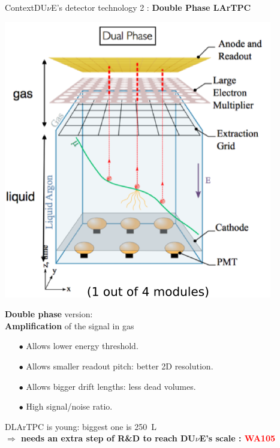 \documentclass[10pt]{beamer}
\begin{document}
    \begin{frame}{Context}{DU$\nu$E's detector technology 2 : \textbf{Double Phase LArTPC}}
    	\begin{scriptsize}
    		\begin{minipage}{0.48\textwidth}
    			\includegraphics[width=\textwidth]{figures/contexte/dlartpc.png}\\
    		\end{minipage}
    		\hfill
    		\begin{minipage}{0.48\textwidth}
    			\textbf{Double phase} version: \\\textbf{Amplification} of the signal in gas
    			\begin{itemize}
    				\item[$\bullet$] Allows lower energy threshold.
    				\item[$\bullet$] Allows smaller readout pitch: better 2D resolution.
    				\item[$\bullet$] Allows bigger drift lengths: less dead volumes.
    				\item[$\bullet$] High signal/noise ratio.
    			\end{itemize}    			
    		\end{minipage}
    	\end{scriptsize}
    	\centering
    	DLArTPC is young: biggest one is \SI{250}{\liter}\\
    	\textbf{$\Rightarrow$ needs an extra step of R\&D to reach DU$\nu$E's scale : \textcolor{red}{WA105}}
    \end{frame}
    
\end{document}

